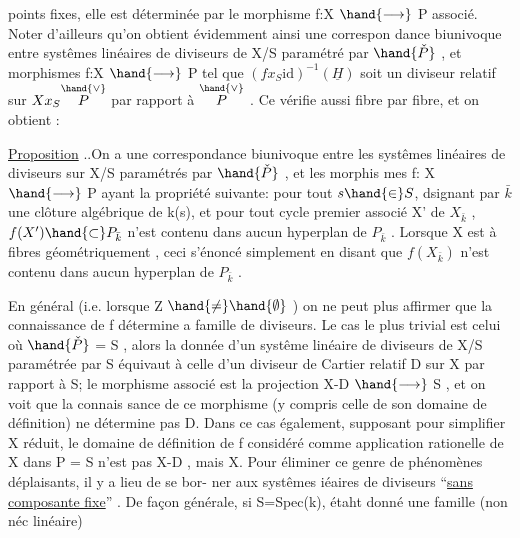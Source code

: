 
points fixes, elle est déterminée  par le morphisme f:X $\hand{\longrightarrow}$ P
associé. Noter d'ailleurs qu'on obtient évidemment ainsi une correspon
dance biunivoque entre systêmes linéaires de diviseurs de X/S paramétré
par $\hand{\check{P}}$ , et morphismes f:X $\hand{\longrightarrow}$ P tel que $(fx_S\mathrm{id})^{-1}(\underline{H})$ soit un
diviseur  relatif sur $Xx_S\overset{\hand{\vee}}{P}$ par rapport à $\overset{\hand{\vee}}{P}$ . Ce  
 vérifie aussi fibre par fibre, et on obtient :

\uline{Proposition} ..On a une correspondance biunivoque entre les 
systêmes linéaires  de diviseurs sur X/S paramétrés par $\hand{\check{P}}$ , et les morphis
mes f: X $\hand{\longrightarrow}$ P ayant la propriété suivante: pour tout $s\hand{\in} S$, dsignant
par $\bar{k}$ une clôture algébrique de k(s), et pour tout cycle premier associé
X' de $X_{\bar{k}}$ , $f(X')\hand{\subset} P_{\bar{k}}$ n'est contenu dans aucun hyperplan de $P_{\bar{k}}$ .
\hand{(}Lorsque X est à fibres géométriquement  , ceci 
 s'énoncé simplement en disant que $f(X_{\bar{k}})$ n'est contenu dans aucun
hyperplan de $P_{\bar{k}}$ \hand{)}.

En général (i.e.  lorsque Z $\hand{\neq}\hand{\emptyset}$ ) on ne peut plus affirmer que
la connaissance de f détermine a famille de diviseurs. Le cas le plus
trivial est celui où $\hand{\check{P}}$ = S , alors la donnée d'un systême linéaire de
diviseurs de X/S paramétrée par S équivaut à celle d'un diviseur de
Cartier relatif D sur X par rapport à S;  le morphisme
associé est la projection X-D $\hand{\longrightarrow}$ S , et on voit  que la connais
sance de ce morphisme (y compris celle de son domaine de définition)
ne détermine pas D. Dans ce cas également, supposant pour simplifier X
réduit, le domaine de définition de  f  considéré
comme application rationelle de X dans P = S n'est pas X-D , mais X.
Pour éliminer ce genre de phénomènes déplaisants, il y a lieu de se bor-%
ner aux systêmes iéaires de diviseurs ``\uline{sans composante fixe}'' . De
façon générale, si S=Spec(k), étaht donné une famille (non néc linéaire)

